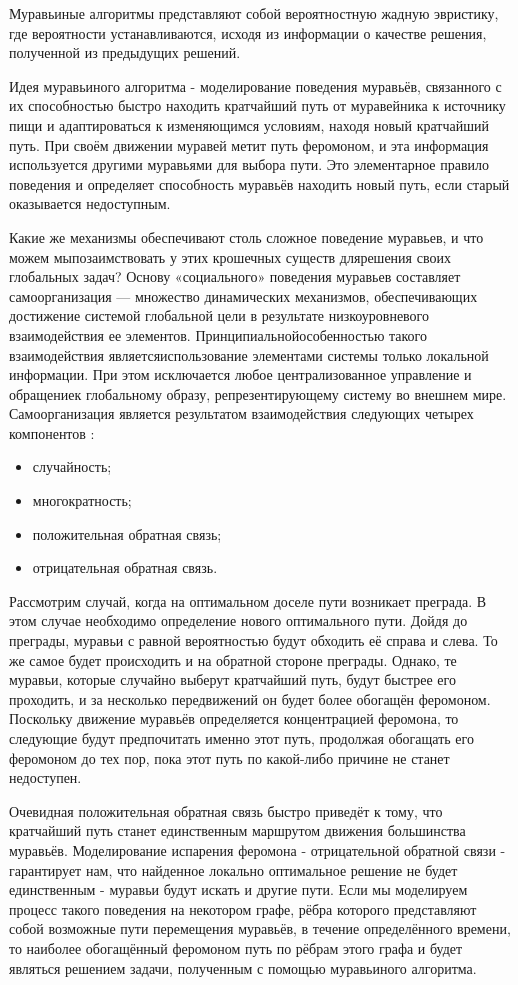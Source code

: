 \documentclass[12pt]{report}
\begin{document}
Муравьиные алгоритмы представляют собой вероятностную жадную эвристику, где вероятности устанавливаются, исходя из информации о качестве решения, полученной из предыдущих решений.

Идея муравьиного алгоритма - моделирование поведения муравьёв, связанного с их способностью быстро находить кратчайший путь от муравейника к источнику пищи и адаптироваться к изменяющимся условиям, находя новый кратчайший путь\cite{ant1}. При своём движении муравей метит путь феромоном, и эта информация используется другими муравьями для выбора пути. Это элементарное правило поведения и определяет способность муравьёв находить новый путь, если старый оказывается недоступным.

Какие же механизмы обеспечивают столь сложное поведение муравьев, и что можем мыпозаимствовать у этих крошечных существ длярешения своих глобальных задач? Основу «социального» поведения муравьев составляет самоорганизация — множество динамических механизмов, обеспечивающих достижение системой глобальной цели в результате низкоуровневого взаимодействия ее элементов. Принципиальнойособенностью такого взаимодействия являетсяиспользование элементами системы только локальной информации. При этом исключается любое централизованное управление и обращениек глобальному образу, репрезентирующему систему во внешнем мире. Самоорганизация является результатом взаимодействия следующих четырех компонентов \cite{shtovba} :
	\begin{itemize}
	\item случайность;
	\item многократность;
	\item положительная обратная связь;
	\item отрицательная обратная связь.
	\end{itemize}

Рассмотрим случай, когда на оптимальном доселе пути возникает преграда. В этом случае необходимо определение нового оптимального пути. Дойдя до преграды, муравьи с равной вероятностью будут обходить её справа и слева. То же самое будет происходить и на обратной стороне преграды. Однако, те муравьи, которые случайно выберут кратчайший путь, будут быстрее его проходить, и за несколько передвижений он будет более обогащён феромоном. Поскольку движение муравьёв определяется концентрацией феромона, то следующие будут предпочитать именно этот путь, продолжая обогащать его феромоном до тех пор, пока этот путь по какой-либо причине не станет недоступен.

Очевидная положительная обратная связь быстро приведёт к тому, что кратчайший путь станет единственным маршрутом движения большинства муравьёв. Моделирование испарения феромона - отрицательной обратной связи - гарантирует нам, что найденное локально оптимальное решение не будет единственным - муравьи будут искать и другие пути. Если мы моделируем процесс такого поведения на некотором графе, рёбра которого представляют собой возможные пути перемещения муравьёв, в течение определённого времени, то наиболее обогащённый феромоном путь по рёбрам этого графа и будет являться решением задачи, полученным с помощью муравьиного алгоритма.
\end{document}
